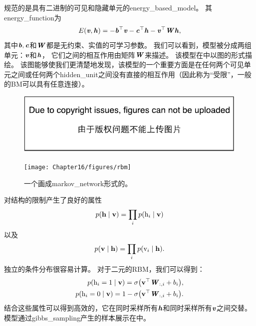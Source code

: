 规范的是具有二进制的可见和隐藏单元的\gls{energy_based_model}。 其\gls{energy_function}为
\begin{align}
\label{eqn:1610}
E(\boldsymbol{\mathit{v}},\boldsymbol{\mathit{h}}) = -\boldsymbol{\mathit{b}}^{\top}\boldsymbol{\mathit{v}} - \boldsymbol{\mathit{c}}^{\top}\boldsymbol{\mathit{h}} - \boldsymbol{\mathit{v}}^{\top}\boldsymbol{\mathit{W}}\boldsymbol{\mathit{h}},
\end{align}
其中$\boldsymbol{\mathit{b}},\boldsymbol{\mathit{c}}$和$\boldsymbol{\mathit{W}}$都是无约束、实值的可学习参数。
我们可以看到，模型被分成两组单元：$\boldsymbol{\mathit{v}}$和$\boldsymbol{\mathit{h}}$，
它们之间的相互作用由矩阵$\boldsymbol{\mathit{W}}$来描述。
该模型在中以图的形式描绘。
该图能够使我们更清楚地发现，该模型的一个重要方面是在任何两个可见单元之间或任何两个\gls{hidden_unit}之间没有直接的相互作用（因此称为``受限''，一般的\gls{BM}可以具有任意连接）。



\begin{figure}[!htb]
\ifOpenSource
\centerline{\includegraphics{figure.pdf}}
\else
	\centerline{\texttt{[image: Chapter16/figures/rbm]}}	
\fi
	\caption{一个画成\gls{markov_network}形式的。}
	\label{fig:rbm}
\end{figure}



对结构的限制产生了良好的属性
\begin{align}
\label{eqn:1611}
p(\mathbf{h}\mid\mathbf{v}) = \prod_i p(\mathrm{h}_i\mid \mathbf{v})
\end{align}
以及
\begin{align}
\label{eqn:1612}
p(\mathbf{v}\mid\mathbf{h}) = \prod_i p(\mathrm{v}_i\mid \mathbf{h}).
\end{align}
独立的条件分布很容易计算。
对于二元的\gls{RBM}，我们可以得到：
\begin{align}
\label{eqn:1613}
\begin{aligned}
p(\mathrm{h}_i = 1\mid\mathbf{v}) = \sigma\big(\mathbf{v}^{\top}\boldsymbol{\mathit{W}}_{:,i} + b_i\big),\\
p(\mathrm{h}_i = 0\mid\mathbf{v}) = 1 - \sigma\big(\mathbf{v}^{\top}\boldsymbol{\mathit{W}}_{:,i} + b_i\big).\\
\end{aligned}
\end{align}
结合这些属性可以得到高效的，它在同时采样所有$\boldsymbol{\mathit{h}}$和同时采样所有$\boldsymbol{\mathit{v}}$之间交替。
模型通过\gls{gibbs_sampling}产生的样本展示在中。

